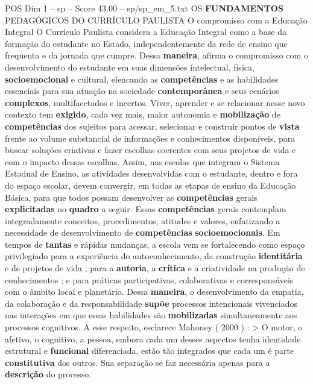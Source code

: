 \begin{textsample}{POS Dim 1 – sp – Score 43.00 – sp/sp\_em\_5.txt}  \label{ex:f1_pos_114}
OS \textbf{FUNDAMENTOS} PEDAGÓGICOS DO CURRÍCULO PAULISTA O compromisso com a Educação Integral O Currículo Paulista considera a Educação Integral como a base da formação do estudante no Estado, independentemente da rede de ensino que frequenta e da jornada que cumpre.
Dessa \textbf{maneira}, afirma o compromisso com o desenvolvimento do estudante em suas dimensões intelectual, física, \textbf{socioemocional} e cultural, elencando as \textbf{competências} e as habilidades essenciais para sua atuação na sociedade \textbf{contemporânea} e seus cenários \textbf{complexos}, multifacetados e incertos.
Viver, aprender e se relacionar nesse novo contexto tem \textbf{exigido}, cada vez mais, maior autonomia e \textbf{mobilização} de \textbf{competências} dos sujeitos para acessar, selecionar e construir pontos de \textbf{vista} frente ao volume substancial de informações e conhecimentos disponíveis, para buscar soluções criativas e fazer escolhas coerentes com seus projetos de vida e com o impacto dessas escolhas.
Assim, nas escolas que integram o Sistema Estadual de Ensino, as atividades desenvolvidas com o estudante, dentro e fora do espaço escolar, devem convergir, em todas as etapas de ensino da Educação Básica, para que todos possam desenvolver as \textbf{competências} gerais \textbf{explicitadas} no \textbf{quadro} a seguir.
Essas \textbf{competências} gerais contemplam integradamente conceitos, procedimentos, atitudes e valores, enfatizando a necessidade de desenvolvimento de \textbf{competências} \textbf{socioemocionais}.
Em tempos de \textbf{tantas} e rápidas mudanças, a escola vem se fortalecendo como espaço privilegiado para a experiência do autoconhecimento, da construção \textbf{identitária} e de projetos de vida ; para a \textbf{autoria}, a \textbf{crítica} e a criatividade na produção de conhecimentos ; e para práticas participativas, colaborativas e corresponsáveis com o âmbito local e planetário.
Dessa \textbf{maneira}, o desenvolvimento da empatia, da colaboração e da responsabilidade \textbf{supõe} processos intencionais vivenciados nas interações em que essas habilidades são \textbf{mobilizadas} simultaneamente aos processos cognitivos.
A esse respeito, esclarece Mahoney ( 2000 ) : > O motor, o afetivo, o cognitivo, a pessoa, embora cada um desses aspectos tenha identidade estrutural e \textbf{funcional} diferenciada, estão tão integrados que cada um é parte \textbf{constitutiva} dos outros.
Sua separação se faz necessária apenas para a \textbf{descrição} do processo.

\end{textsample}
